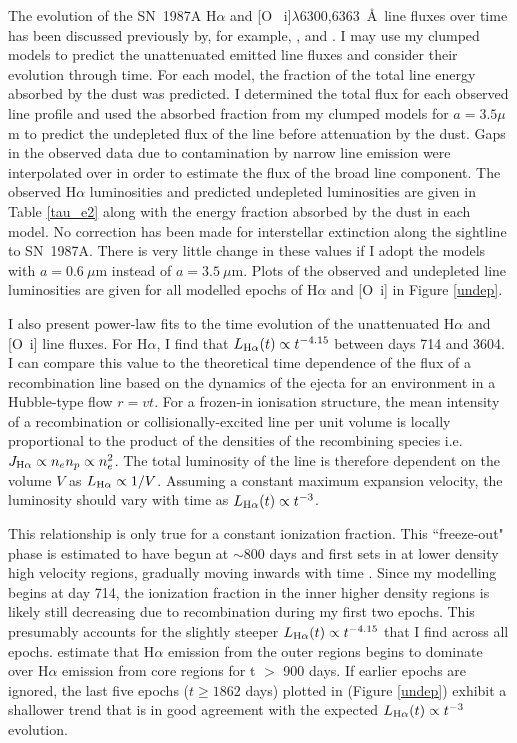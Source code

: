 The evolution of the SN~1987A H$\alpha$ and [O~{\sc 
i}]$\lambda$6300,6363~\AA\ line fluxes over time has been discussed 
previously by, for example, \citet{Li1992}, \citet{Xu1992} and 
\citet{Kozma1998b}. I may use my clumped models to predict the 
unattenuated 
emitted line fluxes and consider their evolution through time.  For each 
model, the fraction of the total line energy absorbed by the dust was 
predicted.  I determined the total flux for each observed line profile 
and used the absorbed fraction from my clumped models for $a=3.5\mu$m to 
predict the undepleted flux of the line before attenuation by the dust.  
Gaps in the observed data due to contamination by narrow line emission 
were interpolated over in order to estimate the flux of the broad line 
component. The observed H$\alpha$ luminosities and predicted undepleted 
luminosities are given in Table \ref{tau_e2} along with the energy fraction 
absorbed by the dust in each model. No correction has been made for 
interstellar extinction along the sightline to SN~1987A.
There is very little change in 
these values if I adopt the models with $a=0.6~\mu$m instead of 
$a=3.5~\mu$m.  Plots of the observed and undepleted line luminosities are 
given for all modelled epochs of H$\alpha$ and [O~{\sc i}] in Figure 
\ref{undep}.


I also present power-law fits to the time evolution of the unattenuated 
H$\alpha$ and [O~{\sc i}] line fluxes.  For H$\alpha$, I find that 
$L_{\rm H\alpha}(t) \propto t^{-4.15}$ between days 714 and 3604.  I can 
compare this value to the theoretical time dependence of the flux of a 
recombination line based on the dynamics of the ejecta for an 
environment in a Hubble-type flow $r=vt$.  For a frozen-in ionisation 
structure, the mean intensity of a recombination or collisionally-excited 
line per unit volume is locally proportional to the product of the 
densities of the recombining species i.e. $J_{\rm H\alpha} \propto n_e n_p 
\propto n_e^2$.  The total luminosity of the line is therefore dependent 
on the volume $V$ as $L_{\rm H\alpha} \propto 1/V $.  Assuming a constant 
maximum expansion velocity, the luminosity should vary with time as 
$L_{\rm H\alpha}(t) \propto t^{-3}$.

This relationship is only true for a constant ionization fraction.  This 
``freeze-out" phase is estimated to have begun at $\sim 800$ days and 
first sets in at lower density high velocity regions, gradually moving 
inwards with time \citep{Danziger1991,Fransson1993}.  Since my modelling 
begins at day 714, the ionization fraction in the inner higher density 
regions is likely still decreasing due to recombination during my first 
two epochs.  This presumably accounts for the slightly steeper 
$L_{\rm H\alpha}(t) \propto t^{-4.15}$ that I find across all epochs.  
\citet{Kozma1998b} estimate that H$\alpha$ emission from the outer regions 
begins to dominate over H$\alpha$ emission from core regions for t $>$ 
900 days. If earlier epochs are ignored, the last five epochs ($t \ge 
1862$ days) plotted in (Figure \ref{undep}) exhibit a shallower trend that 
is in good agreement with the expected $L_{\rm H\alpha}(t) \propto t^{-3}$ 
evolution.

